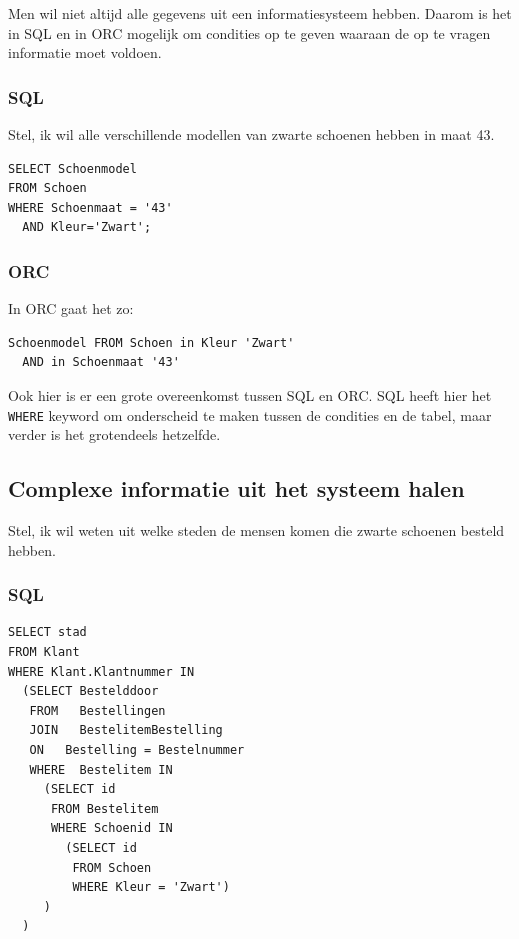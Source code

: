 \documentclass[11pt]{article}
\begin{document}
Men wil niet altijd alle gegevens uit een informatiesysteem hebben. Daarom is
het in SQL en in ORC mogelijk om condities op te geven waaraan de op te vragen
informatie moet voldoen.

\subsubsection{SQL}

Stel, ik wil alle verschillende modellen van zwarte schoenen hebben in maat 43.

\begin{verbatim}
SELECT Schoenmodel 
FROM Schoen 
WHERE Schoenmaat = '43' 
  AND Kleur='Zwart';
\end{verbatim}

\subsubsection{ORC}

In ORC gaat het zo: 

\begin{verbatim}
Schoenmodel FROM Schoen in Kleur 'Zwart' 
  AND in Schoenmaat '43'
\end{verbatim}

Ook hier is er een grote overeenkomst tussen SQL en ORC. SQL heeft hier het 
\verb+WHERE+ keyword om onderscheid te maken tussen de condities en de 
tabel, maar verder is het grotendeels hetzelfde. 

\subsection{Complexe informatie uit het systeem halen}

Stel, ik wil weten uit welke steden de mensen komen die zwarte schoenen 
besteld hebben.

\subsubsection{SQL}

\begin{verbatim}
SELECT stad
FROM Klant
WHERE Klant.Klantnummer IN 
  (SELECT Bestelddoor
   FROM   Bestellingen 
   JOIN   BestelitemBestelling
   ON   Bestelling = Bestelnummer
   WHERE  Bestelitem IN 
     (SELECT id 
      FROM Bestelitem
      WHERE Schoenid IN
        (SELECT id
         FROM Schoen
         WHERE Kleur = 'Zwart')
     )
  )   
\end{verbatim}
\end{document}
